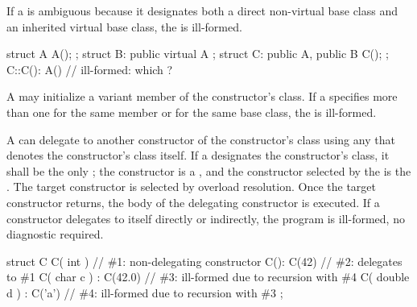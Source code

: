 \pnum
If a
is ambiguous because it designates both a direct non-virtual base class and
an inherited virtual base class, the
is ill-formed.
\begin{example}
\begin{codeblock}
struct A { A(); };
struct B: public virtual A { };
struct C: public A, public B { C(); };
C::C(): A() { }                 // ill-formed: which ?
\end{codeblock}
\end{example}

\pnum
A
may initialize a variant member of the
constructor's class.
If a
specifies more than one
for the same member or for the same base class,
the
is ill-formed.

\pnum
A  can delegate to another
constructor of the constructor's class using any
 that denotes the constructor's class itself. If a
 designates the constructor's class,
it shall be the only ; the constructor
is a , and the constructor selected by the
 is the .
The target constructor is selected by overload resolution.
Once the target constructor returns, the body of the delegating constructor
is executed. If a constructor delegates to itself directly or indirectly,
the program is ill-formed, no diagnostic required.
\begin{example}
\begin{codeblock}
struct C {
  C( int ) { }                  // \#1: non-delegating constructor
  C(): C(42) { }                // \#2: delegates to \#1
  C( char c ) : C(42.0) { }     // \#3: ill-formed due to recursion with \#4
  C( double d ) : C('a') { }    // \#4: ill-formed due to recursion with \#3
};
\end{codeblock}
\end{example}

